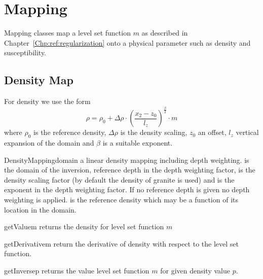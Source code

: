 \chapter{Mapping}\label{Chp:ref:mapping}

Mapping classes map a level set function $m$ as described in Chapter~\ref{Chp:ref:regularization}
onto a physical parameter such as density and susceptibility. 

\section{Density Map}
For density we use the form 
\begin{equation}\label{EQU:MAP:1}
\rho =  \rho_{0} + \Delta \rho \cdot \left( \frac{x_2 - z_0}{l_z} \right)^{\frac{\beta}{2}}  \cdot m 
\end{equation}  
where $\rho_{0}$ is the reference density, $\Delta \rho$ is the density scaling, $z_0$ an offset, $l_z$ vertical expansion
of the domain and $\beta$ is a suitable exponent. 

\begin{classdesc}{DensityMapping}{domain
        }
a linear density mapping including depth weighting.  is the
domain of the inversion,  reference depth in the depth weighting
factor,  is the density scaling factor (by default the density of
granite is used) and  is the exponent in the depth weighting factor.
If no reference depth  is given no depth weighting is applied.
 is the reference density which may be a function of its location
in the domain. 
\end{classdesc}

\begin{methoddesc}[DensityMapping]{getValue}{m}
returns the density for level set function $m$
\end{methoddesc}

\begin{methoddesc}[DensityMapping]{getDerivative}{m}
return the derivative of density  with respect to the level set function.
\end{methoddesc}  

\begin{methoddesc}[DensityMapping]{getInverse}{p}
returns the value level set function $m$ for given density value $p$.
\end{methoddesc}


